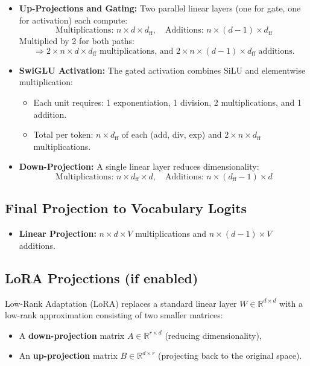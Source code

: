\documentclass[a4paper,12pt]{article}
\begin{document}
\begin{itemize}
  \item \textbf{Up-Projections and Gating:} Two parallel linear layers (one for gate, one for activation) each compute:
  \[
  \text{Multiplications: } n \times d \times d_{\text{ff}}, \quad
  \text{Additions: } n \times (d - 1) \times d_{\text{ff}}
  \]
  Multiplied by 2 for both paths:
  \[
  \Rightarrow 2 \times n \times d \times d_{\text{ff}} \text{ multiplications, and } 2 \times n \times (d - 1) \times d_{\text{ff}} \text{ additions.}
  \]

  \item \textbf{SwiGLU Activation:} The gated activation combines SiLU and elementwise multiplication:
  \begin{itemize}
    \item Each unit requires: 1 exponentiation, 1 division, 2 multiplications, and 1 addition.
    \item Total per token: $n \times d_{\text{ff}}$ of each (add, div, exp) and $2 \times n \times d_{\text{ff}}$ multiplications.
  \end{itemize}

  \item \textbf{Down-Projection:} A single linear layer reduces dimensionality:
  \[
  \text{Multiplications: } n \times d_{\text{ff}} \times d, \quad
  \text{Additions: } n \times (d_{\text{ff}} - 1) \times d
  \]
\end{itemize}


\subsection*{Final Projection to Vocabulary Logits}
\begin{itemize}
  \item \textbf{Linear Projection:} $n \times d \times V$ multiplications and $n \times (d - 1) \times V$ additions.
\end{itemize}

\subsection*{LoRA Projections (if enabled)}

Low-Rank Adaptation (LoRA) replaces a standard linear layer $W \in \mathbb{R}^{d \times d}$ with a low-rank approximation consisting of two smaller matrices:
\begin{itemize}
  \item A \textbf{down-projection} matrix $A \in \mathbb{R}^{r \times d}$ (reducing dimensionality),
  \item An \textbf{up-projection} matrix $B \in \mathbb{R}^{d \times r}$ (projecting back to the original space).
\end{itemize}
\end{document}
